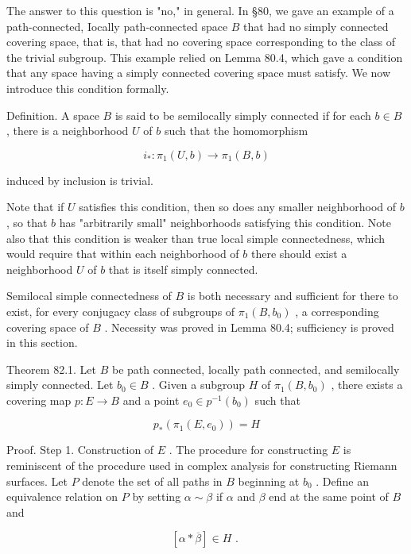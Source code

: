 \documentclass[10pt]{article}
\begin{document}
The answer to this question is "no," in general. In §80, we gave an example of a path-connected, Iocally path-connected space \(B\) that had no simply connected covering space, that is, that had no covering space corresponding to the class of the trivial subgroup. This example relied on Lemma 80.4, which gave a condition that any space having a simply connected covering space must satisfy. We now introduce this condition formally.

Definition. A space \(B\) is said to be semilocally simply connected if for each \(b \in  B\) , there is a neighborhood \(U\) of \(b\) such that the homomorphism

\[
{i}_{ * } : {\pi }_{1}\left( {U,b}\right)  \rightarrow  {\pi }_{1}\left( {B,b}\right)
\]

induced by inclusion is trivial.

Note that if \(U\) satisfies this condition, then so does any smaller neighborhood of \(b\) , so that \(b\) has "arbitrarily small" neighborhoods satisfying this condition. Note also that this condition is weaker than true local simple connectedness, which would require that within each neighborhood of \(b\) there should exist a neighborhood \(U\) of \(b\) that is itself simply connected.

Semilocal simple connectedness of \(B\) is both necessary and sufficient for there to exist, for every conjugacy class of subgroups of \({\pi }_{1}\left( {B,{b}_{0}}\right)\) , a corresponding covering space of \(B\) . Necessity was proved in Lemma 80.4; sufficiency is proved in this section.

Theorem 82.1. Let \(B\) be path connected, locally path connected, and semilocally simply connected. Let \({b}_{0} \in  B\) . Given a subgroup \(H\) of \({\pi }_{1}\left( {B,{b}_{0}}\right)\) , there exists a covering map \(p : E \rightarrow  B\) and a point \({e}_{0} \in  {p}^{-1}\left( {b}_{0}\right)\) such that

\[
{p}_{ * }\left( {{\pi }_{1}\left( {E,{e}_{0}}\right) }\right)  = H
\]

Proof. Step 1. Construction of \(E\) . The procedure for constructing \(E\) is reminiscent of the procedure used in complex analysis for constructing Riemann surfaces. Let \(P\) denote the set of all paths in \(B\) beginning at \({b}_{0}\) . Define an equivalence relation on \(P\) by setting \(\alpha  \sim  \beta\) if \(\alpha\) and \(\beta\) end at the same point of \(B\) and

\[
\left\lbrack  {\alpha  * \overline{\beta }}\right\rbrack   \in  H\text{ . }
\]
\end{document}
